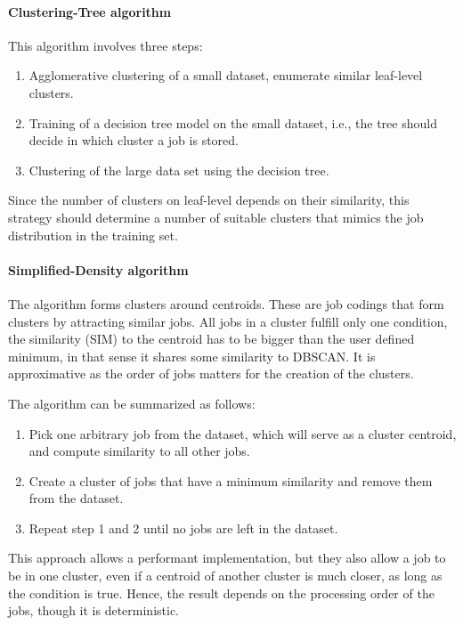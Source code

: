 \documentclass{jhps}
\begin{document}
\paragraph{Clustering-Tree algorithm}
This algorithm involves three steps:

\begin{enumerate}
 \item Agglomerative clustering of a small dataset, enumerate similar leaf-level clusters.
 \item Training of a decision tree model on the small dataset, i.e., the tree should decide in which cluster a job is stored.
 \item Clustering of the large data set using the decision tree.
\end{enumerate}

Since the number of clusters on leaf-level depends on their similarity, this strategy should determine a number of suitable clusters that mimics the job distribution in the training set.

\paragraph{Simplified-Density algorithm}

The algorithm forms clusters around centroids.
These are job codings that form clusters by attracting similar jobs.
All jobs in a cluster fulfill only one condition, the similarity (SIM) to the centroid has to be bigger than the user defined minimum, in that sense it shares some similarity to DBSCAN.
It is approximative as the order of jobs matters for the creation of the clusters.

The algorithm can be summarized as follows:
\begin{enumerate}
 \item Pick one arbitrary job from the dataset, which will serve as a cluster centroid, and compute similarity to all other jobs.
 \item Create a cluster of jobs that have a minimum similarity and remove them from the dataset.
 \item Repeat step 1 and 2 until no jobs are left in the dataset.
\end{enumerate}

This approach allows a performant implementation, but they also allow a job to be in one cluster, even if a centroid of another cluster is much closer, as long as the condition is true.
Hence, the result depends on the processing order of the jobs, though it is deterministic.
\end{document}
